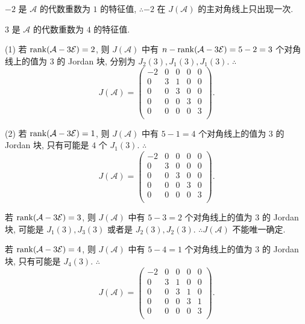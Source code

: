 \documentclass{ctexart}
\begin{document}
\begin{solution}
    $-2$ 是 $\mathcal{A}$ 的代数重数为 $1$ 的特征值, $\therefore-2$ 在 $J(\mathcal{A})$ 的主对角线上只出现一次.

    $3$ 是 $\mathcal{A}$ 的代数重数为 $4$ 的特征值.

    (1) 若 $\operatorname{rank} (\mathcal{A}-3\mathcal{E})=2$, 则 $J(\mathcal{A})$ 中有 $n-\operatorname{rank} (\mathcal{A}-3\mathcal{E})=5-2=3$ 个对角线上的值为 $3$ 的 Jordan 块, 分别为 $J_2(3),J_1(3),J_1(3)$. $\therefore$
    \[J(\mathcal{A})=\begin{pmatrix}
        -2 & 0 & 0 & 0 & 0 \\
        0 & 3 & 1 & 0 & 0 \\
        0 & 0 & 3 & 0 & 0 \\
        0 & 0 & 0 & 3 & 0 \\
        0 & 0 & 0 & 0 & 3 \\
    \end{pmatrix}.\]

    (2) 若 $\operatorname{rank} (\mathcal{A}-3\mathcal{E})=1$, 则 $J(\mathcal{A})$ 中有 $5-1=4$ 个对角线上的值为 $3$ 的 Jordan 块, 只有可能是 $4$ 个 $J_1(3)$. $\therefore$
    \[J(\mathcal{A})=\begin{pmatrix}
        -2 & 0 & 0 & 0 & 0 \\
        0 & 3 & 0 & 0 & 0 \\
        0 & 0 & 3 & 0 & 0 \\
        0 & 0 & 0 & 3 & 0 \\
        0 & 0 & 0 & 0 & 3 \\
    \end{pmatrix}.\]

    若 $\operatorname{rank} (\mathcal{A}-3\mathcal{E})=3$, 则 $J(\mathcal{A})$ 中有 $5-3=2$ 个对角线上的值为 $3$ 的 Jordan 块, 可能是 $J_1(3),J_3(3)$ 或者是 $J_2(3),J_2(3)$. $\therefore J(\mathcal{A})$ 不能唯一确定.

    若 $\operatorname{rank} (\mathcal{A}-3\mathcal{E})=4$, 则 $J(\mathcal{A})$ 中有 $5-4=1$ 个对角线上的值为 $3$ 的 Jordan 块, 只有可能是 $J_4(3)$. $\therefore$
    \[J(\mathcal{A})=\begin{pmatrix}
        -2 & 0 & 0 & 0 & 0 \\
        0 & 3 & 1 & 0 & 0 \\
        0 & 0 & 3 & 1 & 0 \\
        0 & 0 & 0 & 3 & 1 \\
        0 & 0 & 0 & 0 & 3 \\
    \end{pmatrix}.\]
\end{solution}
\end{document}
